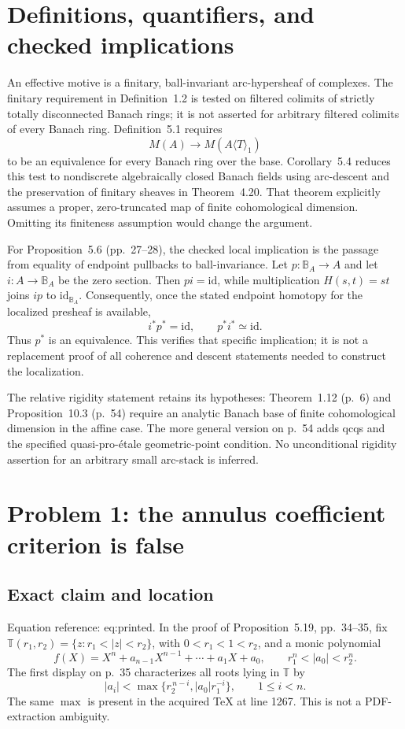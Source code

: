 \documentclass[10pt]{article}
\begin{document}
\section*{Definitions, quantifiers, and checked implications}
An effective motive is a finitary, ball-invariant arc-hypersheaf of complexes. The finitary requirement in Definition 1.2 is tested on filtered colimits of strictly totally disconnected Banach rings; it is not asserted for arbitrary filtered colimits of every Banach ring. Definition 5.1 requires \[M(A)\longrightarrow M(A\langle T\rangle_1)\] to be an equivalence for every Banach ring over the base. Corollary 5.4 reduces this test to nondiscrete algebraically closed Banach fields using arc-descent and the preservation of finitary sheaves in Theorem 4.20. That theorem explicitly assumes a proper, zero-truncated map of finite cohomological dimension. Omitting its finiteness assumption would change the argument.\par
For Proposition 5.6 (pp. 27–28), the checked local implication is the passage from equality of endpoint pullbacks to ball-invariance. Let \(p:\mathbb B_A\to A\) and let \(i:A\to\mathbb B_A\) be the zero section. Then \(p i=\mathrm{id}\), while multiplication \(H(s,t)=st\) joins \(i p\) to \(\mathrm{id}_{\mathbb B_A}\). Consequently, once the stated endpoint homotopy for the localized presheaf is available, \[i^*p^*=\mathrm{id},\qquad p^*i^*\simeq\mathrm{id}.\] Thus \(p^*\) is an equivalence. This verifies that specific implication; it is not a replacement proof of all coherence and descent statements needed to construct the localization.\par
The relative rigidity statement retains its hypotheses: Theorem 1.12 (p. 6) and Proposition 10.3 (p. 54) require an analytic Banach base of finite cohomological dimension in the affine case. The more general version on p. 54 adds qcqs and the specified quasi-pro-étale geometric-point condition. No unconditional rigidity assertion for an arbitrary small arc-stack is inferred.\par
\section*{Problem 1: the annulus coefficient criterion is false}
\subsection*{Exact claim and location}
Equation reference: eq:printed. In the proof of Proposition 5.19, pp. 34–35, fix \(\mathbb T(r_1,r_2)=\{z:r_1<|z|<r_2\}\), with \(0<r_1<1<r_2\), and a monic polynomial \[f(X)=X^n+a_{n-1}X^{n-1}+\cdots+a_1X+a_0,
\qquad r_1^n<|a_0|<r_2^n.\] The first display on p. 35 characterizes all roots lying in \(\mathbb T\) by \[
|a_i|<\max\{r_2^{\,n-i},|a_0|r_1^{-i}\},
\qquad 1\leq i<n.\] The same \(\max\) is present in the acquired TeX at line 1267. This is not a PDF-extraction ambiguity.\par
\end{document}
